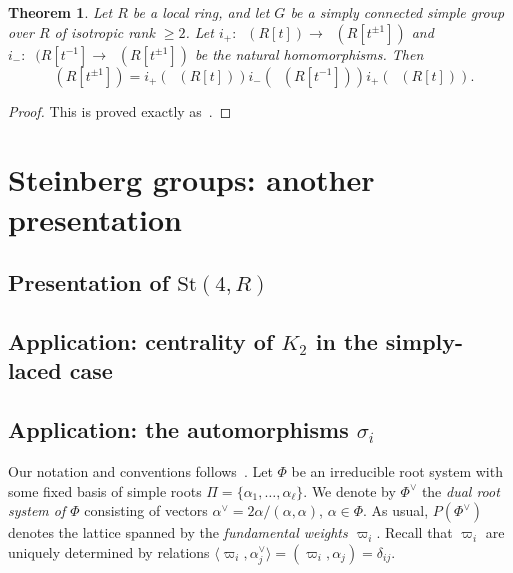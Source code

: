 \documentclass[oneside,12pt]{amsart}
\newtheorem{thm}{Theorem}
\numberwithin{equation}{section}
\numberwithin{lem}{section}
\theoremstyle{definition}
\theoremstyle{remark}
\DeclareMathOperator{\St}{St^G}
\newcommand{\Stb}{\mathrm{St}}
\begin{document}
\begin{thm}\label{thm:3t}
Let $R$ be a local ring, and let $G$ be a simply connected simple group over $R$
of isotropic rank $\ge 2$. Let $i_+:\St(R[t])\to\St(R[t^{\pm 1}])$ and $i_-:\St(R[t^{-1}]\to
\St(R[t^{\pm 1}])$ be the natural homomorphisms.
Then
$$
\St(R[t^{\pm 1}])=i_+(\St(R[t]))i_-(\St(R[t^{-1}]))i_+(\St(R[t])).
$$
\end{thm}
\begin{proof}
This is proved exactly as~\cite[Theorem 5.1]{St-poly}.
\end{proof}



\section{Steinberg groups: another presentation}

\subsection{Presentation of \texorpdfstring{$\Stb(4, R)$}{St(4, R)}} \label{sec:stbA3} 

\subsection{Application: centrality of \texorpdfstring{$K_2$}{K\texttwoinferior} in the simply-laced case}


\subsection{Application: the automorphisms \texorpdfstring{$\sigma_i$}{\textsigma\textiinferior}} \label{sec:sigma}
Our notation and conventions follows~\cite[\S~4]{VavWE}.
Let $\Phi$ be an irreducible root system with some fixed basis of simple roots $\Pi = \{\alpha_1, \ldots, \alpha_\ell\}$.
We denote by $\Phi^\vee$ the \emph{dual root system of $\Phi$} consisting of vectors $\alpha^\vee = 2\alpha/(\alpha, \alpha)$, $\alpha\in \Phi$.
As usual, $P(\Phi^\vee)$ denotes the lattice spanned by the \emph{fundamental weights $\varpi_i$}.
Recall that $\varpi_i$ are uniquely determined by relations $\langle\varpi_i, \alpha_j^\vee \rangle = (\varpi_i, \alpha_j) = \delta_{ij}.$
\end{document}
